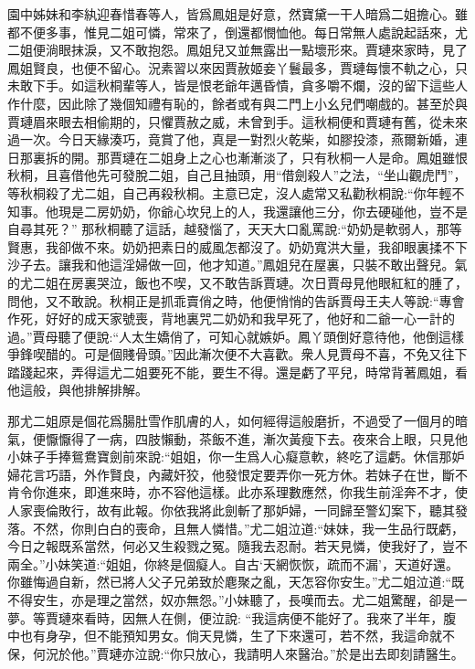 \begin{parag}
    園中姊妹和李紈迎春惜春等人，皆爲鳳姐是好意，然寶黛一干人暗爲二姐擔心。雖都不便多事，惟見二姐可憐，常來了，倒還都憫恤他。每日常無人處說起話來，尤二姐便淌眼抹淚，又不敢抱怨。鳳姐兒又並無露出一點壞形來。賈璉來家時，見了鳳姐賢良，也便不留心。況素習以來因賈赦姬妾丫鬟最多，賈璉每懷不軌之心，只未敢下手。如這秋桐輩等人，皆是恨老爺年邁昏憒，貪多嚼不爛，沒的留下這些人作什麼，因此除了幾個知禮有恥的，餘者或有與二門上小幺兒們嘲戲的。甚至於與賈璉眉來眼去相偷期的，只懼賈赦之威，未曾到手。這秋桐便和賈璉有舊，從未來過一次。今日天緣湊巧，竟賞了他，真是一對烈火乾柴，如膠投漆，燕爾新婚，連日那裏拆的開。那賈璉在二姐身上之心也漸漸淡了，只有秋桐一人是命。鳳姐雖恨秋桐，且喜借他先可發脫二姐，自己且抽頭，用“借劍殺人”之法，“坐山觀虎鬥”，等秋桐殺了尤二姐，自己再殺秋桐。主意已定，沒人處常又私勸秋桐說:“你年輕不知事。他現是二房奶奶，你爺心坎兒上的人，我還讓他三分，你去硬碰他，豈不是自尋其死？” 那秋桐聽了這話，越發惱了，天天大口亂罵說:“奶奶是軟弱人，那等賢惠，我卻做不來。奶奶把素日的威風怎都沒了。奶奶寬洪大量，我卻眼裏揉不下沙子去。讓我和他這淫婦做一回，他才知道。”鳳姐兒在屋裏，只裝不敢出聲兒。氣的尤二姐在房裏哭泣，飯也不喫，又不敢告訴賈璉。次日賈母見他眼紅紅的腫了，問他，又不敢說。秋桐正是抓乖賣俏之時，他便悄悄的告訴賈母王夫人等說:“專會作死，好好的成天家號喪，背地裏咒二奶奶和我早死了，他好和二爺一心一計的過。”賈母聽了便說:“人太生嬌俏了，可知心就嫉妒。鳳丫頭倒好意待他，他倒這樣爭鋒喫醋的。可是個賤骨頭。”因此漸次便不大喜歡。衆人見賈母不喜，不免又往下踏踐起來，弄得這尤二姐要死不能，要生不得。還是虧了平兒，時常背著鳳姐，看他這般，與他排解排解。
\end{parag}


\begin{parag}
    那尤二姐原是個花爲腸肚雪作肌膚的人，如何經得這般磨折，不過受了一個月的暗氣，便懨懨得了一病，四肢懶動，茶飯不進，漸次黃瘦下去。夜來合上眼，只見他小妹子手捧鴛鴦寶劍前來說:“姐姐，你一生爲人心癡意軟，終吃了這虧。休信那妒婦花言巧語，外作賢良，內藏奸狡，他發恨定要弄你一死方休。若妹子在世，斷不肯令你進來，即進來時，亦不容他這樣。此亦系理數應然，你我生前淫奔不才，使人家喪倫敗行，故有此報。你依我將此劍斬了那妒婦，一同歸至警幻案下，聽其發落。不然，你則白白的喪命，且無人憐惜。”尤二姐泣道:“妹妹，我一生品行既虧，今日之報既系當然，何必又生殺戮之冤。隨我去忍耐。若天見憐，使我好了，豈不兩全。”小妹笑道:“姐姐，你終是個癡人。自古‘天網恢恢，疏而不漏’，天道好還。你雖悔過自新，然已將人父子兄弟致於麀聚之亂，天怎容你安生。”尤二姐泣道:“既不得安生，亦是理之當然，奴亦無怨。”小妹聽了，長嘆而去。尤二姐驚醒，卻是一夢。等賈璉來看時，因無人在側，便泣說: “我這病便不能好了。我來了半年，腹中也有身孕，但不能預知男女。倘天見憐，生了下來還可，若不然，我這命就不保，何況於他。”賈璉亦泣說:“你只放心，我請明人來醫治。”於是出去即刻請醫生。
\end{parag}


